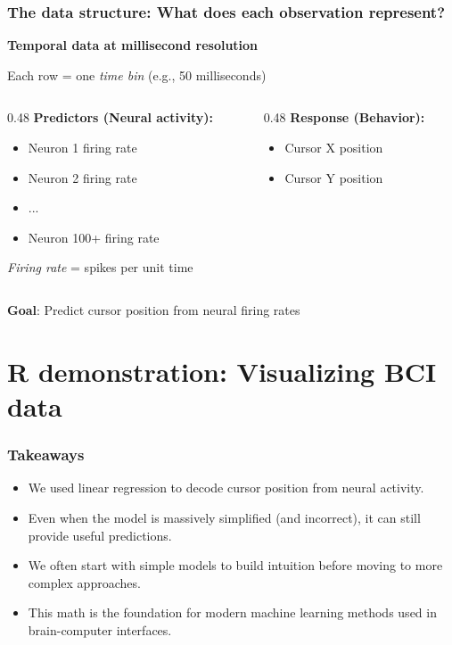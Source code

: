 \documentclass[slidestop,compress,mathserif]{beamer}
\begin{document}
\begin{frame}
\frametitle{The data structure: What does each observation represent?}

\textbf{Temporal data at millisecond resolution}

\vspace{0.3cm}

Each row = one \textit{time bin} (e.g., 50 milliseconds)

\vspace{0.3cm}

\begin{columns}
\begin{column}{0.48\textwidth}
\textbf{Predictors (Neural activity):}
\small
\begin{itemize}
\item Neuron 1 firing rate
\item Neuron 2 firing rate
\item ...
\item Neuron 100+ firing rate
\end{itemize}

\textit{Firing rate} = spikes per unit time
\end{column}

\begin{column}{0.48\textwidth}
\textbf{Response (Behavior):}
\small
\begin{itemize}
\item Cursor X position
\item Cursor Y position
\end{itemize}

\end{column}
\end{columns}

\vspace{0.3cm}

\textbf{Goal}: Predict cursor position from neural firing rates

\end{frame}


\section{R demonstration: Visualizing BCI data}

\begin{frame}
\frametitle{Takeaways}

\begin{itemize}
\item We used linear regression to decode cursor position from neural activity. \pause
\item Even when the model is massively simplified (and incorrect), it can still provide useful predictions. \pause
\item We often start with simple models to build intuition before moving to more complex approaches.\pause
\item This math is the foundation for modern machine learning methods used in brain-computer interfaces.
\end{itemize}
\end{frame}
\end{document}
